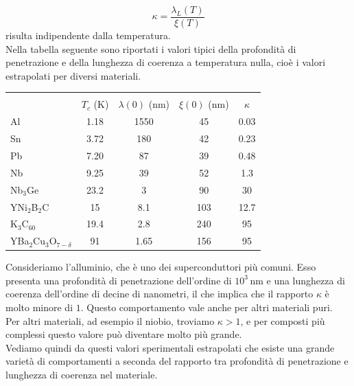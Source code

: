 \begin{equation*}
   \kappa = \frac{\lambda_L(T)}{\xi(T)}
\end{equation*}
risulta indipendente dalla temperatura.\\
Nella tabella seguente sono riportati i valori tipici della profondità di penetrazione e della lunghezza di coerenza a temperatura nulla, cioè i valori estrapolati per diversi materiali.
\begin{table}[H]
   \centering
   \begin{tabular}{lcccc}
      \hline
      \\[-0.35cm]
      & $T_c$ (K) & $\lambda(0)$ (nm) & $\xi(0)$ (nm) & $\kappa$ \\[0.1cm]
      \hline
      Al & 1.18 & 1550 & 45 & 0.03 \\
      Sn & 3.72 & 180 & 42 & 0.23 \\
      Pb & 7.20 & 87 & 39 & 0.48 \\
      Nb & 9.25 & 39 & 52 & 1.3 \\
      Nb$_3$Ge & 23.2 & 3 & 90 & 30 \\
      YNi$_2$B$_2$C & 15 & 8.1 & 103 & 12.7 \\
      K$_3$C$_{60}$ & 19.4 & 2.8 & 240 & 95 \\
      YBa$_2$Cu$_3$O$_{7-\delta}$ & 91 & 1.65 & 156 & 95 \\
      \hline
   \end{tabular}
\end{table}
\hspace{-0.6cm}Consideriamo l'alluminio, che è uno dei superconduttori più comuni. Esso presenta una profondità di penetrazione dell'ordine di $10^3\,\mathrm{nm}$ e una lunghezza di coerenza dell'ordine di decine di nanometri, il che implica che il rapporto $\kappa$ è molto minore di $1$. Questo comportamento vale anche per altri materiali puri.\\
Per altri materiali, ad esempio il niobio, troviamo $\kappa>1$, e per composti più complessi questo valore può diventare molto più grande.\\
Vediamo quindi da questi valori sperimentali estrapolati che esiste una grande varietà di comportamenti a seconda del rapporto tra profondità di penetrazione e lunghezza di coerenza nel materiale.

